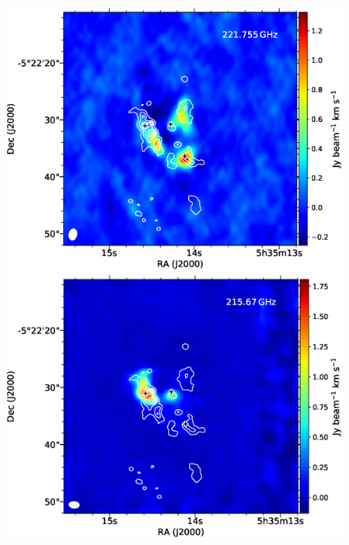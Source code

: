 \begin{figure}[H]
\begin{center}
\begin{minipage}{0.98\textwidth} 
\begin{center}
\begin{minipage}{0.48\textwidth}
\begin{center}
\includegraphics[width=0.98\textwidth]{OrionKL/mom0/221.755SV_mom0_3-7.eps}
\end{center}
\end{minipage}
\begin{minipage}{0.48\textwidth}
\begin{center}
\includegraphics[width=0.98\textwidth]{OrionKL/mom0/215.67mom0_3-7.eps}
\end{center}
\end{minipage}
\end{center}
\end{minipage}


\end{center}
\end{figure}
